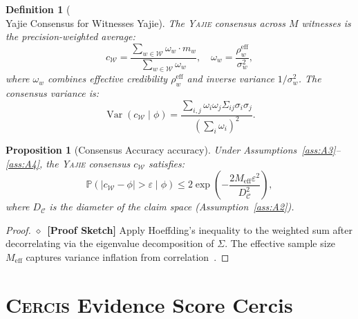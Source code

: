 \documentclass[11pt,a4paper]{article}
\newtheorem{proposition}[theorem]{Proposition}
\newtheorem{definition}[theorem]{Definition}
\theoremstyle{definition}
\newcommand{\rigorSketch}[0]{$\diamond$~\textbf{[Proof Sketch]}}
\newcommand{\Yajie}{\textsc{Yajie}}
\newcommand{\Cercis}{\textsc{Cercis}}
\DeclareMathOperator{\Var}{Var}
\newcommand{\Pbb}{\mathbb{P}}
\newcommand{\abs}[1]{\left|#1\right|}
\newcommand{\witnessSet}{\mathcal{W}}           %
\newcommand{\fact}{\phi}                        %
\newcommand{\claimSpace}{\mathcal{C}}           %
\begin{document}
\begin{definition}[\\Yajie{} Consensus for Witnesses Yajie]
\label{def:yajie_consensus}
The \Yajie{} consensus across $M$ witnesses is the precision-weighted average:
\begin{equation}
    c_{\witnessSet} = \frac{\sum_{w \in \witnessSet} \omega_w \cdot m_w}{\sum_{w \in \witnessSet} \omega_w}, \quad \omega_w = \frac{\rho_w^{\mathrm{eff}}}{\sigma_w^2},
    \label{eq:yajie_consensus}
\end{equation}
where $\omega_w$ combines effective credibility $\rho_w^{\mathrm{eff}}$ and inverse variance $1/\sigma_w^2$. The consensus variance is:
\begin{equation}
    \Var(c_{\witnessSet} \mid \fact) = \frac{\sum_{i,j} \omega_i \omega_j \Sigma_{ij} \sigma_i \sigma_j}{(\sum_i \omega_i)^2}.
    \label{eq:consensus_variance}
\end{equation}
\end{definition}

\begin{proposition}[Consensus Accuracy accuracy]
\label{prop:consensus_accuracy}
Under Assumptions~\ref{ass:A3}--\ref{ass:A4}, the \Yajie{} consensus $c_{\witnessSet}$ satisfies:
\begin{equation}
    \Pbb\left(\abs{c_{\witnessSet} - \fact} > \varepsilon \mid \fact\right) \leq 2\exp\left(-\frac{2 M_{\mathrm{eff}} \varepsilon^2}{D_\claimSpace^2}\right),
    \label{eq:consensus_accuracy}
\end{equation}
where $D_\claimSpace$ is the diameter of the claim space (Assumption~\ref{ass:A2}).
\end{proposition}

\begin{proof} \rigorSketch
Apply Hoeffding's inequality to the weighted sum after decorrelating via the eigenvalue decomposition of $\Sigma$. The effective sample size $M_{\mathrm{eff}}$ captures variance inflation from correlation~\cite{Hoeffding1963}.
\end{proof}

\section{\Cercis{} Evidence Score Cercis}
\label{sec:cercis}
\end{document}
